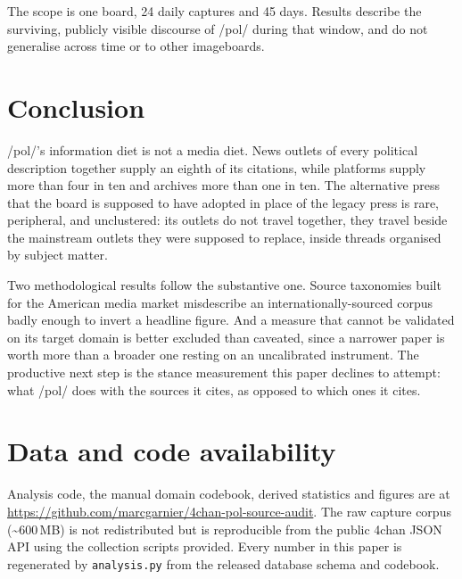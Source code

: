 \documentclass[11pt]{article}
\begin{document}
The scope is one board, 24 daily captures and 45 days. Results describe the
surviving, publicly visible discourse of /pol/ during that window, and do not
generalise across time or to other imageboards.

\section{Conclusion}

/pol/'s information diet is not a media diet. News outlets of every political
description together supply an eighth of its citations, while platforms supply
more than four in ten and archives more than one in ten. The alternative press
that the board is supposed to have adopted in place of the legacy press is
rare, peripheral, and unclustered: its outlets do not travel together, they
travel beside the mainstream outlets they were supposed to replace, inside
threads organised by subject matter.

Two methodological results follow the substantive one. Source taxonomies built
for the American media market misdescribe an internationally-sourced corpus
badly enough to invert a headline figure. And a measure that cannot be validated
on its target domain is better excluded than caveated, since a narrower paper is
worth more than a broader one resting on an uncalibrated instrument. The
productive next step is the stance measurement this paper declines to attempt:
what /pol/ does with the sources it cites, as opposed to which ones it cites.

\section*{Data and code availability}

Analysis code, the manual domain codebook, derived statistics and figures are at
\url{https://github.com/marcgarnier/4chan-pol-source-audit}. The raw capture
corpus (\textasciitilde 600\,MB) is not redistributed but is reproducible from
the public 4chan JSON API using the collection scripts provided. Every number in
this paper is regenerated by \texttt{analysis.py} from the released database
schema and codebook.
\end{document}
